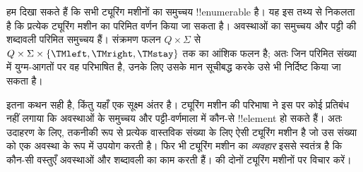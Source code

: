 \documentclass[../../../include/open-logic-section]{subfiles}
\begin{document}

\begin{explain}
हम दिखा सकते हैं कि सभी ट्यूरिंग मशीनों का समुच्चय !!{enumerable} है।
यह इस तथ्य से निकलता है कि प्रत्येक ट्यूरिंग मशीन का परिमित वर्णन किया
जा सकता है। अवस्थाओं का समुच्चय और पट्टी की शब्दावली परिमित समुच्चय हैं।
संक्रमण फलन $Q \times \Sigma$ से
$Q \times \Sigma \times \{\TMleft, \TMright, \TMstay\}$ तक का आंशिक
फलन है; अतः जिन परिमित संख्या में युग्म-आगतों पर वह परिभाषित है, उनके
लिए उसके मान सूचीबद्ध करके उसे भी निर्दिष्ट किया जा सकता है।

इतना कथन सही है, किंतु यहाँ एक सूक्ष्म अंतर है। ट्यूरिंग मशीन की परिभाषा
ने इस पर कोई प्रतिबंध नहीं लगाया कि अवस्थाओं के समुच्चय और पट्टी-वर्णमाला
में कौन-से !!{element} हो सकते हैं। अतः उदाहरण के लिए, तकनीकी रूप से
प्रत्येक वास्तविक संख्या के लिए ऐसी ट्यूरिंग मशीन है जो उस संख्या को एक
अवस्था के रूप में उपयोग करती है। फिर भी ट्यूरिंग मशीन का \emph{व्यवहार}
इससे स्वतंत्र है कि कौन-सी वस्तुएँ अवस्थाओं और शब्दावली का काम करती हैं।
 की दोनों ट्यूरिंग मशीनों पर विचार करें।
\begin{figure}
\begin{center}
\\
\end{center}
\end{figure}
\end{explain}
\end{document}
